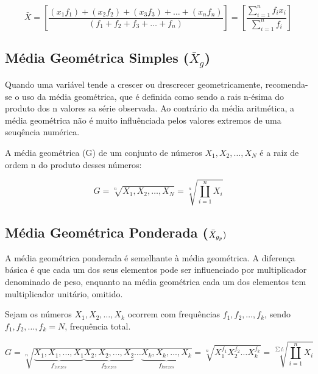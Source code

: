 \begin{equation}\label{media2}
     \bar{X}= \left[ \frac{(x_{1}f_{1}) + (x_{2}f_{2}) + (x_{3}f_{3})+
 \ldots + (x_{n}f_{n})}{(f_{1}+f_{2}+f_{3}+\ldots+f_{n})} \right ]=   \left[\frac{\sum_{i=1}^{n}f_{i}x_{i}}{\sum_{i=1}^{n}f_{i}} \right ]
\end{equation}

\subsection{Média Geométrica Simples ($\bar{X}_{g}$)}

Quando uma variável tende a crescer ou drescrecer geometricamente, recomenda-se o uso da média geométrica, que é definida como sendo a rais n-ésima do produto dos n valores sa série observada. Ao contrário da média aritmética, a média geométrica não é muito influênciada pelos valores extremos de uma seuqência numérica.\vskip0.3cm


A média geométrica (G) de um conjunto de números $X_{1},X_{2},\ldots,X_{N}$ é a raiz de ordem n do produto
desses números:

\begin{equation}\label{Geometrica}
    G=\sqrt[n]{X_{1},X_{2},\ldots,X_{N}}=\sqrt[n]{\coprod_{i=1}^{n}X_{i}}
\end{equation}


\subsection{Média Geométrica Ponderada ($\Bar{X}_{g_{p}})$}

A média geométrica ponderada é semelhante à média geométrica. A diferença básica é que cada um dos seus elementos pode ser influenciado por multiplicador denominado de peso, enquanto na média geométrica cada um dos elementos tem multiplicador unitário, omitido.\vskip0.3cm


Sejam os números $X_{1},X_{2},\ldots,X_{k}$ ocorrem com frequências $f_{1},f_{2},\ldots,f_{k}$, sendo $f_{1},f_{2},\ldots,f_{k}=N$, frequência total.


\begin{equation}\label{Geometrica}
    G=\sqrt[n]{\underbrace{X_{1},X_{1},...,X_{1}}_{f_{1vezes}}\underbrace{X_{2},X_{2},...,X_{2}}_{f_{2vezes}} \ldots \underbrace{X_{k},X_{k},...,X_{k}}_{f_{kvezes}}}=\sqrt[n]{X_{1}^{f_{1}}X_{2}^{f_{2}}\ldots X_{k}^{f_{k}}}
 = \sqrt[\sum f_{i}]{\coprod_{i=1}^{n}X_{i}}
\end{equation}

